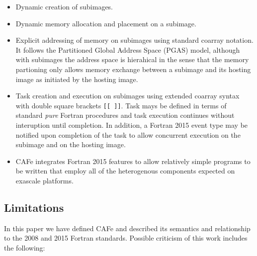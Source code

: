 \begin{itemize}
\item
  Dynamic creation of subimages.
\item
  Dynamic memory allocation and placement on a subimage.
\item
  Explicit addressing of memory on subimages using standard coarray notation.  It follows
  the Partitioned Global Address Space (PGAS) model, although with subimages the address
  space is hierahical in the sense that the memory partioning only allows memory exchange
  between a subimage and its hosting image as initiated by the hosting image.
\item
  Task creation and execution on subimages using extended coarray syntax with double
  square brackets \texttt{[[ ]]}.  Task mays be defined in terms of standard \emph{pure}
  Fortran procedures and task execution continues without interuption until completion.
  In addition, a Fortran 2015 event type may be notified upon completion of the task to allow
  concurrent execution on the subimage and on the hosting image.
\item
  CAFe integrates Fortran 2015 features to allow relatively simple programs to be written
  that employ all of the heterogenous components expected on exascale platforms.
\end{itemize}

\subsection{Limitations}

In this paper we have defined CAFe and described its semantics and relationship to the 2008 and
2015 Fortran standards.  Possible criticism of this work includes the following:

